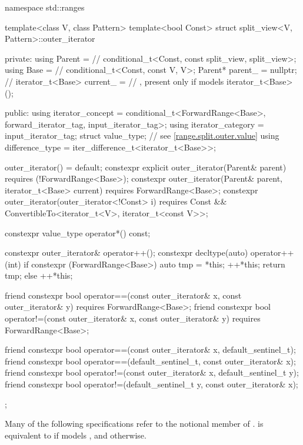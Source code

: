 \begin{codeblock}
namespace std::ranges {
  template<class V, class Pattern>
  template<bool Const>
  struct split_view<V, Pattern>::outer_iterator {
  private:
    using Parent =                              // \expos
      conditional_t<Const, const split_view, split_view>;
    using Base   =                              // \expos
      conditional_t<Const, const V, V>;
    Parent* parent_ = nullptr;                  // \expos
    iterator_t<Base> current_ =                 // \expos, present only if  models 
      iterator_t<Base>();

  public:
    using iterator_concept  =
      conditional_t<ForwardRange<Base>, forward_iterator_tag, input_iterator_tag>;
    using iterator_category = input_iterator_tag;
    struct value_type;                                  // see \ref{range.split.outer.value}
    using difference_type   = iter_difference_t<iterator_t<Base>>;

    outer_iterator() = default;
    constexpr explicit outer_iterator(Parent& parent)
      requires (!ForwardRange<Base>);
    constexpr outer_iterator(Parent& parent, iterator_t<Base> current)
      requires ForwardRange<Base>;
    constexpr outer_iterator(outer_iterator<!Const> i)
      requires Const && ConvertibleTo<iterator_t<V>, iterator_t<const V>>;

    constexpr value_type operator*() const;

    constexpr outer_iterator& operator++();
    constexpr decltype(auto) operator++(int) {
      if constexpr (ForwardRange<Base>) {
        auto tmp = *this;
        ++*this;
        return tmp;
      } else
        ++*this;
    }

    friend constexpr bool operator==(const outer_iterator& x, const outer_iterator& y)
      requires ForwardRange<Base>;
    friend constexpr bool operator!=(const outer_iterator& x, const outer_iterator& y)
      requires ForwardRange<Base>;

    friend constexpr bool operator==(const outer_iterator& x, default_sentinel_t);
    friend constexpr bool operator==(default_sentinel_t, const outer_iterator& x);
    friend constexpr bool operator!=(const outer_iterator& x, default_sentinel_t y);
    friend constexpr bool operator!=(default_sentinel_t y, const outer_iterator& x);
  };
}
\end{codeblock}

\pnum
Many of the following specifications refer to the notional member
 of .
 is equivalent to  if 
models , and  otherwise.

